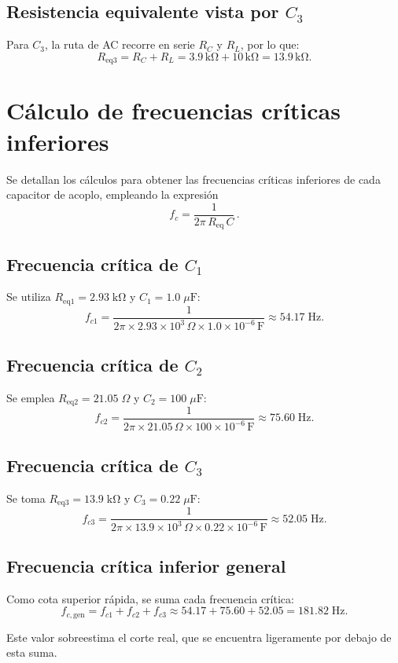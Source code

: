 \documentclass[journal]{IEEEtran}
\begin{document}
\subsection*{Resistencia equivalente vista por \(C_3\)}
\par Para \(C_3\), la ruta de AC recorre en serie \(R_C\) y \(R_L\), por lo que:
\[
R_{\mathrm{eq3}}
= R_C + R_L
= 3.9\,\mathrm{k\Omega} + 10\,\mathrm{k\Omega}
= 13.9\,\mathrm{k\Omega}.
\]

\section*{Cálculo de frecuencias críticas inferiores}

Se detallan los cálculos para obtener las frecuencias críticas inferiores de cada capacitor de acoplo, empleando la expresión
\[
f_c = \frac{1}{2\pi\,R_{\mathrm{eq}}\,C}\,.
\]

\subsection*{Frecuencia crítica de \(C_1\)}
Se utiliza \(R_{\mathrm{eq1}} = 2.93\;\mathrm{k\Omega}\) y \(C_1 = 1.0\;\mu\mathrm{F}\):
\[
f_{c1}
= \frac{1}{2\pi \times 2.93\times 10^3\,\Omega \times 1.0\times10^{-6}\,\mathrm{F}}
\approx 54.17\;\mathrm{Hz}.
\]

\subsection*{Frecuencia crítica de \(C_2\)}
Se emplea \(R_{\mathrm{eq2}} = 21.05\;\Omega\) y \(C_2 = 100\;\mu\mathrm{F}\):
\[
f_{c2}
= \frac{1}{2\pi \times 21.05\,\Omega \times 100\times10^{-6}\,\mathrm{F}}
\approx 75.60\;\mathrm{Hz}.
\]

\subsection*{Frecuencia crítica de \(C_3\)}
Se toma \(R_{\mathrm{eq3}} = 13.9\;\mathrm{k\Omega}\) y \(C_3 = 0.22\;\mu\mathrm{F}\):
\[
f_{c3}
= \frac{1}{2\pi \times 13.9\times10^3\,\Omega \times 0.22\times10^{-6}\,\mathrm{F}}
\approx 52.05\;\mathrm{Hz}.
\]

\subsection*{Frecuencia crítica inferior general}
Como cota superior rápida, se suma cada frecuencia crítica:
\[
f_{c,\mathrm{gen}}
= f_{c1} + f_{c2} + f_{c3}
\approx 54.17 + 75.60 + 52.05
= 181.82\;\mathrm{Hz}.
\]
\par Este valor sobreestima el corte real, que se encuentra ligeramente por debajo de esta suma.  
\end{document}
